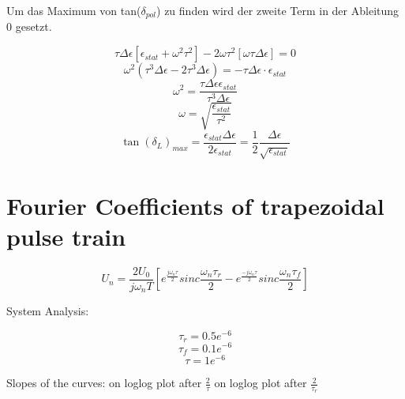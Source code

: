Um das Maximum von tan($\delta_{pol}$) zu finden wird der zweite Term in der Ableitung 0 gesetzt.

\begin{equation}
\tau \Delta \epsilon [\epsilon_{stat} + \omega^2 \tau^2] -2\omega \tau^2 [\omega \tau \Delta \epsilon] = 0
\end{equation}
\begin{equation}
\omega^2 (\tau^3 \Delta \epsilon -2 \tau^3 \Delta \epsilon) = - \tau \Delta \epsilon \cdot \epsilon_{stat}
\end{equation}
\begin{equation}
\omega^2 = \frac{\tau \Delta \epsilon \epsilon_{stat}}{\tau^3 \Delta \epsilon}
\end{equation}
\begin{equation}
\omega = \sqrt{\frac{\epsilon_{stat}}{\tau^2}}
\end{equation}
\begin{equation}
\tan(\delta_L)_{max} = \frac{\epsilon_{stat} \Delta\epsilon}{2\epsilon_{stat}} = \frac{1}{2} \frac{\Delta \epsilon}{\sqrt{\epsilon_{stat}}}
\end{equation}


\section{Fourier Coefficients of trapezoidal pulse  train }
\begin{equation}
 U_n = \frac{2 U_0}{j \omega_n T} [e^{\frac{j \omega_n \tau}{2}} sinc{\frac { \omega_n \tau_r }{2}} -e^{\frac{-j \omega_n \tau}{2}} sinc{\frac{ \omega_n \tau_f}{2}}]
\end{equation}
 
System Analysis: 
 
 
\begin{equation}
 \tau_r = 0.5e^{-6 }
  \end{equation}
  \begin{equation}
 \tau_f = 0.1e^{-6}
  \end{equation}
 \begin{equation}
\tau= 1e^{-6}
 \end{equation}
 
Slopes of the curves:  on loglog plot after $\frac{2}{\tau}$  on loglog plot after $\frac{2}{\tau_r}$




